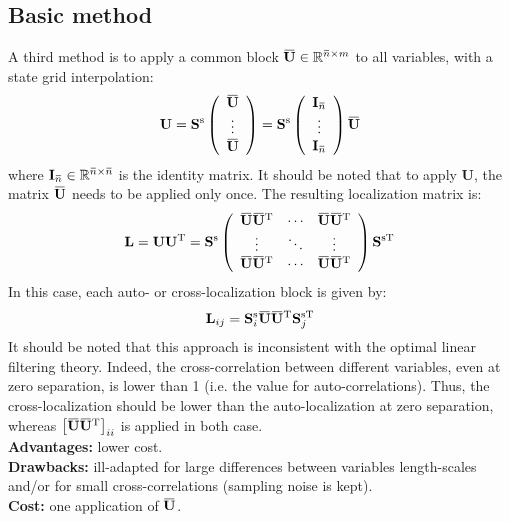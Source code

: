 \documentclass[12pt]{scrartcl}
\newcommand{\overbar}[1]{\mkern 1.5mu\overline{\mkern-1.5mu#1\mkern-1.5mu}\mkern 1.5mu}
\begin{document}
\subsection{Basic method}
A third method is to apply a common block $\overbar{\mathbf{U}} \in \mathbb{R}^{\overbar{n} \times m}$ to all variables, with a state grid interpolation:
\begin{align}
\mathbf{U} = \mathbf{S}^\mathrm{s} \left( \begin{array}{c}
\overbar{\mathbf{U}} \\
\vdots \\
\overbar{\mathbf{U}}
\end{array} \right) = \mathbf{S}^\mathrm{s} \left( \begin{array}{c}
\mathbf{I}_{\overbar{n}} \\
\vdots \\
\mathbf{I}_{\overbar{n}} \\
\end{array} \right) \overbar{\mathbf{U}}
\end{align}
where $\mathbf{I}_{\overbar{n}} \in \mathbb{R}^{\overbar{n} \times \overbar{n}}$ is the identity matrix. It should be noted that to apply $\mathbf{U}$, the matrix $\overbar{\mathbf{U}}$ needs to be applied only once. The resulting localization matrix is:
\begin{align}
\mathbf{L} = \mathbf{U} \mathbf{U}^\mathrm{T} = \mathbf{S}^\mathrm{s} \left( \begin{array}{ccc}
\overbar{\mathbf{U}} \overbar{\mathbf{U}}^\mathrm{T} & \cdots & \overbar{\mathbf{U}} \overbar{\mathbf{U}}^\mathrm{T} \\
\vdots & \ddots & \vdots  \\
\overbar{\mathbf{U}} \overbar{\mathbf{U}}^\mathrm{T} & \cdots & \overbar{\mathbf{U}} \overbar{\mathbf{U}}^\mathrm{T}
\end{array} \right) \mathbf{S}^{\mathrm{s} \mathrm{T}}
\end{align}
In this case, each auto- or cross-localization block is given by:
\begin{align}
\mathbf{L}_{ij} = \mathbf{S}^\mathrm{s}_i \overbar{\mathbf{U}} \overbar{\mathbf{U}}^\mathrm{T} \mathbf{S}_j^{\mathrm{s} \mathrm{T}}
\end{align}
It should be noted that this approach is inconsistent with the optimal linear filtering theory. Indeed, the cross-correlation between different variables, even at zero separation, is lower than 1 (i.e. the value for auto-correlations). Thus, the cross-localization should be lower than the auto-localization at zero separation, whereas $\left[\overbar{\mathbf{U}} \overbar{\mathbf{U}}^\mathrm{T}\right]_{ii}$ is applied in both case.\\
$  $\\
\textbf{Advantages:} lower cost.\\
\textbf{Drawbacks:} ill-adapted for large differences between variables length-scales and/or for small cross-correlations (sampling noise is kept).\\
\textbf{Cost:} one application of $\overbar{\mathbf{U}}$.
\end{document}
